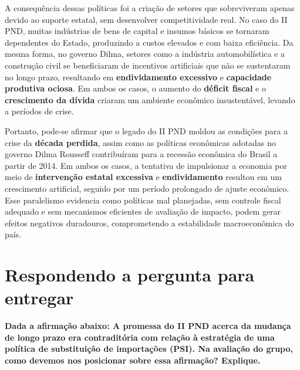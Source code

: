\documentclass[a4paper,12pt]{article}[abntex2]
\begin{document}
A consequência dessas políticas foi a criação de setores que sobreviveram apenas devido ao suporte estatal, sem desenvolver competitividade real. No caso do II PND, muitas indústrias de bens de capital e insumos básicos se tornaram dependentes do Estado, produzindo a custos elevados e com baixa eficiência. Da mesma forma, no governo Dilma, setores como a indústria automobilística e a construção civil se beneficiaram de incentivos artificiais que não se sustentaram no longo prazo, resultando em \textbf{endividamento excessivo} e \textbf{capacidade produtiva ociosa}. Em ambos os casos, o aumento do \textbf{déficit fiscal} e o \textbf{crescimento da dívida} criaram um ambiente econômico insustentável, levando a períodos de crise.

Portanto, pode-se afirmar que o legado do II PND moldou as condições para a crise da \textbf{década perdida}, assim como as políticas econômicas adotadas no governo Dilma Rousseff contribuíram para a recessão econômica do Brasil a partir de 2014. Em ambos os casos, a tentativa de impulsionar a economia por meio de \textbf{intervenção estatal excessiva} e \textbf{endividamento} resultou em um crescimento artificial, seguido por um período prolongado de ajuste econômico. Esse paralelismo evidencia como políticas mal planejadas, sem controle fiscal adequado e sem mecanismos eficientes de avaliação de impacto, podem gerar efeitos negativos duradouros, comprometendo a estabilidade macroeconômica do país.

\newpage
\section{\textbf{Respondendo a pergunta para entregar}}
\textbf{Dada a afirmação abaixo: A promessa do II PND acerca da mudança de longo prazo era contraditória com relação à estratégia de uma política de substituição de importações (PSI). Na avaliação do grupo, como devemos nos posicionar sobre essa afirmação? Explique.}
\end{document}
